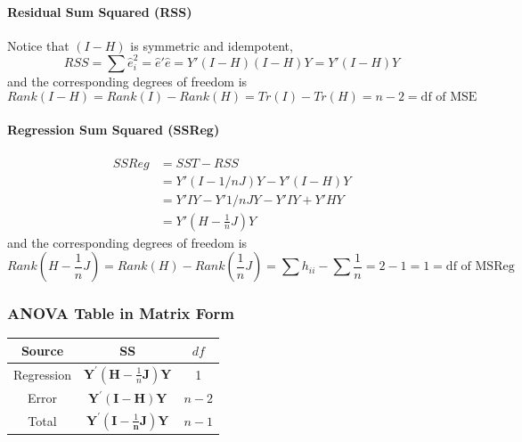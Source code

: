 \documentclass[11pt]{article}
\begin{document}
\paragraph{Residual Sum Squared (RSS)}
Notice that $(I - H)$ is symmetric and idempotent,
\begin{equation*}
    R S S=\sum \hat{e}_{i}^{2} = \hat{e}' \hat{e} = Y'(I - H)(I - H)Y = Y'(I - H)Y
\end{equation*}
and the corresponding degrees of freedom is
\begin{equation*}
    Rank(I - H) = Rank(I) - Rank(H) = Tr(I) - Tr(H) = n-2 = \text{df of MSE}
\end{equation*}

\paragraph{Regression Sum Squared (SSReg)}
\begin{align*}
    SSReg &= SST - RSS \\
    &= Y'(I - 1/n J)Y - Y'(I - H)Y \\
    &= Y'IY - Y' 1/n JY - Y'IY + Y'HY \\
    &= Y'(H - \frac{1}{n}J) Y
\end{align*}
and the corresponding degrees of freedom is
\begin{equation*}
    Rank(H - \frac{1}{n}J) = Rank(H) - Rank(\frac{1}{n}J) = \sum h_{ii} - \sum \frac{1}{n} = 2 - 1 = 1 = \text{df of MSReg}
\end{equation*}

\subsubsection{ANOVA Table in Matrix Form}
\begin{center}
    \begin{tabular}{|c||c|c|}
        \hline
        Source & SS & $df$ \\ \hline
        Regression & $\mathbf{Y}^{\prime}\left(\mathbf{H}-\frac{1}{n} \mathbf{J}\right) \mathbf{Y}$ & 1 \\ \hline
        Error & $\mathbf{Y}^{\prime}(\mathbf{I}-\mathbf{H}) \mathbf{Y}$ & $n-2$ \\ \hline
        Total & $\mathbf{Y}^{\prime}\left(\mathbf{I}-\frac{1}{\mathbf{n}} \mathbf{J}\right) \mathbf{Y}$ & $n-1$ \\ \hline
    \end{tabular}
\end{center}
\end{document}
